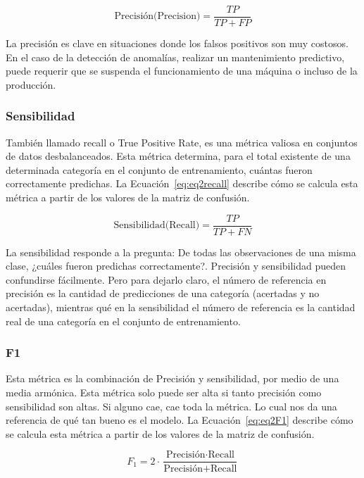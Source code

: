 \documentclass[11pt,a4paper,spanish]{book}
\numberwithin{equation}{chapter}
\numberwithin{figure}{chapter}
\begin{document}
\begin{equation}\label{eq:eq2precision}
\text{Precisión(Precision)} = \frac{TP}{TP + FP}
\end{equation}

La precisión es clave en situaciones donde los falsos positivos son muy costosos. En el 
caso de la detección de anomalías, realizar un mantenimiento predictivo, puede requerir 
que se suspenda el funcionamiento de una máquina o incluso de la producción. 


\subsubsection{Sensibilidad}

También llamado recall o True Positive Rate, es una métrica valiosa en conjuntos de 
datos desbalanceados. Esta métrica determina, para el total existente de una determinada 
categoría en el conjunto de entrenamiento, cuántas fueron correctamente predichas. La 
Ecuación~\eqref{eq:eq2recall} describe cómo se calcula esta métrica a partir de los 
valores de la matriz de confusión. 

\begin{equation}\label{eq:eq2recall}
\text{Sensibilidad(Recall)} = \frac{TP}{TP + FN}
\end{equation}

La sensibilidad responde a la pregunta: De todas las observaciones de una misma clase, 
¿cuáles fueron predichas correctamente?. Precisión y sensibilidad pueden confundirse 
fácilmente. Pero para dejarlo claro, el número de referencia en precisión es la 
cantidad de predicciones de una categoría (acertadas y no acertadas), mientras qué en 
la sensibilidad el número de referencia es la cantidad real de una categoría en el 
conjunto de entrenamiento.


\subsubsection{F1}

Esta métrica es la combinación de Precisión y sensibilidad, por medio de una media 
armónica. Esta métrica solo puede ser alta si tanto precisión como sensibilidad son 
altas. Si alguno cae, cae toda la métrica. Lo cual nos da una referencia de qué tan 
bueno es el modelo. La Ecuación~\eqref{eq:eq2F1} describe cómo se calcula esta métrica 
a partir de los valores de la matriz de confusión. 

\begin{equation}\label{eq:eq2F1}
F_1 = 2 \cdot \frac{\text{Precisión} \cdot \text{Recall}}{\text{Precisión} + \text{Recall}}
\end{equation}
\end{document}
